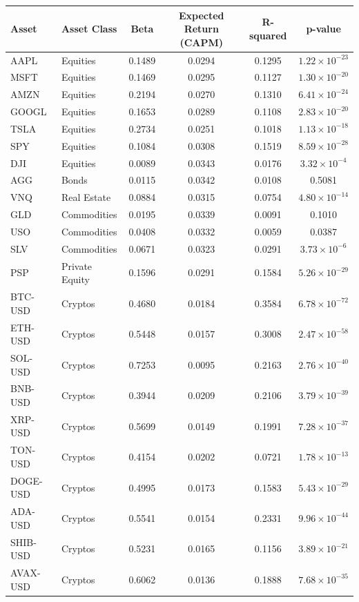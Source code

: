 \documentclass{ledger}
\begin{document}
\begin{longtable}{|l|l|c|c|c|c|}
\hline
\textbf{Asset} & \textbf{Asset Class} & \textbf{Beta} & \textbf{Expected Return (CAPM)} & \textbf{R-squared} & \textbf{p-value} \\
\hline
AAPL & Equities & 0.1489 & 0.0294 & 0.1295 & $1.22 \times 10^{-23}$ \\
MSFT & Equities & 0.1469 & 0.0295 & 0.1127 & $1.30 \times 10^{-20}$ \\
AMZN & Equities & 0.2194 & 0.0270 & 0.1310 & $6.41 \times 10^{-24}$ \\
GOOGL & Equities & 0.1653 & 0.0289 & 0.1108 & $2.83 \times 10^{-20}$ \\
TSLA & Equities & 0.2734 & 0.0251 & 0.1018 & $1.13 \times 10^{-18}$ \\
SPY & Equities & 0.1084 & 0.0308 & 0.1519 & $8.59 \times 10^{-28}$ \\
DJI & Equities & 0.0089 & 0.0343 & 0.0176 & $3.32 \times 10^{-4}$ \\
AGG & Bonds & 0.0115 & 0.0342 & 0.0108 & 0.5081 \\
VNQ & Real Estate & 0.0884 & 0.0315 & 0.0754 & $4.80 \times 10^{-14}$ \\
GLD & Commodities & 0.0195 & 0.0339 & 0.0091 & 0.1010 \\
USO & Commodities & 0.0408 & 0.0332 & 0.0059 & 0.0387 \\
SLV & Commodities & 0.0671 & 0.0323 & 0.0291 & $3.73 \times 10^{-6}$ \\
PSP & Private Equity & 0.1596 & 0.0291 & 0.1584 & $5.26 \times 10^{-29}$ \\
BTC-USD & Cryptos & 0.4680 & 0.0184 & 0.3584 & $6.78 \times 10^{-72}$ \\
ETH-USD & Cryptos & 0.5448 & 0.0157 & 0.3008 & $2.47 \times 10^{-58}$ \\
SOL-USD & Cryptos & 0.7253 & 0.0095 & 0.2163 & $2.76 \times 10^{-40}$ \\
BNB-USD & Cryptos & 0.3944 & 0.0209 & 0.2106 & $3.79 \times 10^{-39}$ \\
XRP-USD & Cryptos & 0.5699 & 0.0149 & 0.1991 & $7.28 \times 10^{-37}$ \\
TON-USD & Cryptos & 0.4154 & 0.0202 & 0.0721 & $1.78 \times 10^{-13}$ \\
DOGE-USD & Cryptos & 0.4995 & 0.0173 & 0.1583 & $5.43 \times 10^{-29}$ \\
ADA-USD & Cryptos & 0.5541 & 0.0154 & 0.2331 & $9.96 \times 10^{-44}$ \\
SHIB-USD & Cryptos & 0.5231 & 0.0165 & 0.1156 & $3.89 \times 10^{-21}$ \\
AVAX-USD & Cryptos & 0.6062 & 0.0136 & 0.1888 & $7.68 \times 10^{-35}$ \\
\hline
\end{longtable}




\thispagestyle{pagelast}





\end{document}
